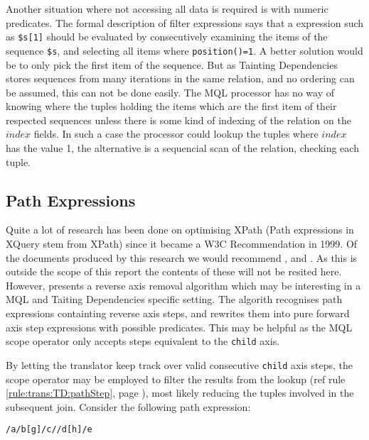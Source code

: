 Another situation where not accessing all data is required is with numeric predicates. The formal description of
filter expressions\cite{xquery_semantics} says that a expression such as \texttt{\$s[1]} should be evaluated by
consecutively examining the items of the sequence \texttt{\$s}, and selecting all items where
\texttt{position()=1}. A better solution would be to only pick the first item of the sequence. But as Tainting
Dependencies stores sequences from many iterations in the same relation, and no ordering can be assumed, this can
not be done easily. The MQL processor has no way of knowing where the tuples holding the items which are the
first item of their respected sequences unless there is some kind of indexing of the relation on the $index$
fields. In such a case the processor could lookup the tuples where $index$ has the value 1, the alternative is a
sequencial scan of the relation, checking each tuple.

\subsection{Path Expressions}
\label{sect:disc:optim:path}
Quite a lot of research has been done on optimising XPath (Path expressions in XQuery stem from XPath) since it
became a W3C Recommendation in 1999. Of the documents produced by this research we would recommend
\cite{optimize_logic}, \cite{optimize_michiels} and \cite{optimize_xsltPath}. As this is outside the scope of this
report the contents of these will not be resited here. However, \cite{optimize_forward} presents a reverse axis
removal algorithm which may be interesting in a MQL and Taiting Dependencies specific setting. The algorith
recognises path expressions containting reverse axis steps, and rewrites them into pure forward axis step
expressions with possible predicates. This may be helpful as the MQL \textsf{scope} operator only accepts steps
equivalent to the \texttt{child} axis.

By letting the translator keep track over valid consecutive \texttt{child} axis steps, the \textsf{scope} operator
may be employed to filter the results from the lookup (ref rule \ref{rule:trans:TD:pathStep}, page
\pageref{rule:trans:TD:pathStep}), most likely reducing the tuples involved in the subsequent join. Consider the
following path expression:

\begin{center}
\texttt{/a/b[g]/c//d[h]/e}
\end{center}

